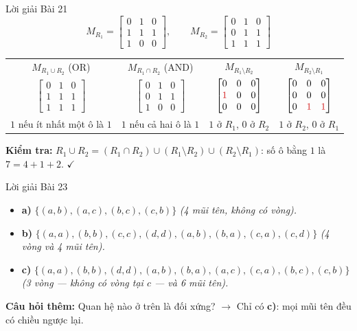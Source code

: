 \documentclass[12pt,a4paper]{article}
\begin{document}
\begin{baitap}{Lời giải Bài 21}
\[
  M_{R_1} = \begin{bmatrix} 0 & 1 & 0 \\ 1 & 1 & 1 \\ 1 & 0 & 0 \end{bmatrix}, \qquad
  M_{R_2} = \begin{bmatrix} 0 & 1 & 0 \\ 0 & 1 & 1 \\ 1 & 1 & 1 \end{bmatrix}
\]
\begin{center}
\renewcommand{\arraystretch}{1.2}
\begin{tabular}{cccc}
$M_{R_1 \cup R_2}$ (OR) & $M_{R_1 \cap R_2}$ (AND) & $M_{R_1 \setminus R_2}$ & $M_{R_2 \setminus R_1}$ \\[4pt]
$\begin{bmatrix} 0 & 1 & 0 \\ 1 & 1 & 1 \\ 1 & 1 & 1 \end{bmatrix}$ &
$\begin{bmatrix} 0 & 1 & 0 \\ 0 & 1 & 1 \\ 1 & 0 & 0 \end{bmatrix}$ &
$\begin{bmatrix} 0 & 0 & 0 \\ \textcolor{AccentRed}{1} & 0 & 0 \\ 0 & 0 & 0 \end{bmatrix}$ &
$\begin{bmatrix} 0 & 0 & 0 \\ 0 & 0 & 0 \\ 0 & \textcolor{AccentRed}{1} & \textcolor{AccentRed}{1} \end{bmatrix}$ \\[22pt]
{\footnotesize $1$ nếu ít nhất một ô là $1$} &
{\footnotesize $1$ nếu cả hai ô là $1$} &
{\footnotesize $1$ ở $R_1$, $0$ ở $R_2$} &
{\footnotesize $1$ ở $R_2$, $0$ ở $R_1$}
\end{tabular}
\end{center}
\textbf{Kiểm tra:} $R_1 \cup R_2 = (R_1 \cap R_2) \cup (R_1 \setminus R_2) \cup (R_2 \setminus R_1)$: số ô bằng $1$ là $7 = 4 + 1 + 2$. $\checkmark$
\end{baitap}

\begin{baitap}{Lời giải Bài 23}
\begin{itemize}
  \item \textbf{a)} $\{(a, b), (a, c), (b, c), (c, b)\}$ \quad \textit{(4 mũi tên, không có vòng).}
  \item \textbf{b)} $\{(a, a), (b, b), (c, c), (d, d), (a, b), (b, a), (c, a), (c, d)\}$ \quad \textit{(4 vòng và 4 mũi tên).}
  \item \textbf{c)} $\{(a, a), (b, b), (d, d), (a, b), (b, a), (a, c), (c, a), (b, c), (c, b)\}$ \quad \textit{(3 vòng --- không có vòng tại $c$ --- và 6 mũi tên).}
\end{itemize}
\textbf{Câu hỏi thêm:} Quan hệ nào ở trên là đối xứng? $\rightarrow$ Chỉ có \textbf{c)}: mọi mũi tên đều có chiều ngược lại.
\end{baitap}
\end{document}
